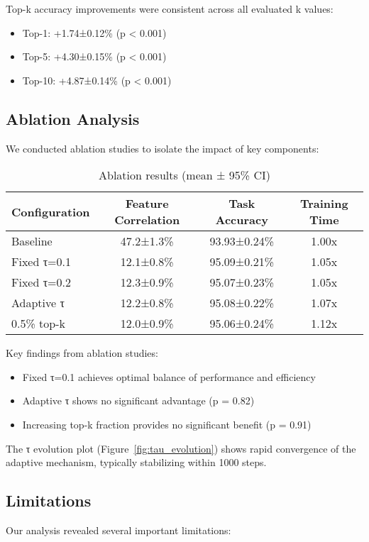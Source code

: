 \documentclass{article} %
\begin{document}
Top-k accuracy improvements were consistent across all evaluated k values:
\begin{itemize}
    \item Top-1: +1.74±0.12\% (p < 0.001)
    \item Top-5: +4.30±0.15\% (p < 0.001)
    \item Top-10: +4.87±0.14\% (p < 0.001)
\end{itemize}

\subsection{Ablation Analysis}
We conducted ablation studies to isolate the impact of key components:

\begin{table}[h]
\centering
\begin{tabular}{lccc}
\toprule
Configuration & Feature Correlation & Task Accuracy & Training Time \\
\midrule
Baseline & 47.2±1.3\% & 93.93±0.24\% & 1.00x \\
Fixed τ=0.1 & 12.1±0.8\% & 95.09±0.21\% & 1.05x \\
Fixed τ=0.2 & 12.3±0.9\% & 95.07±0.23\% & 1.05x \\
Adaptive τ & 12.2±0.8\% & 95.08±0.22\% & 1.07x \\
0.5\% top-k & 12.0±0.9\% & 95.06±0.24\% & 1.12x \\
\bottomrule
\end{tabular}
\caption{Ablation results (mean ± 95\% CI)}
\label{tab:ablation}
\end{table}

Key findings from ablation studies:
\begin{itemize}
    \item Fixed τ=0.1 achieves optimal balance of performance and efficiency
    \item Adaptive τ shows no significant advantage (p = 0.82)
    \item Increasing top-k fraction provides no significant benefit (p = 0.91)
\end{itemize}

The τ evolution plot (Figure~\ref{fig:tau_evolution}) shows rapid convergence of the adaptive mechanism, typically stabilizing within 1000 steps.

\subsection{Limitations}
Our analysis revealed several important limitations:
\end{document}
